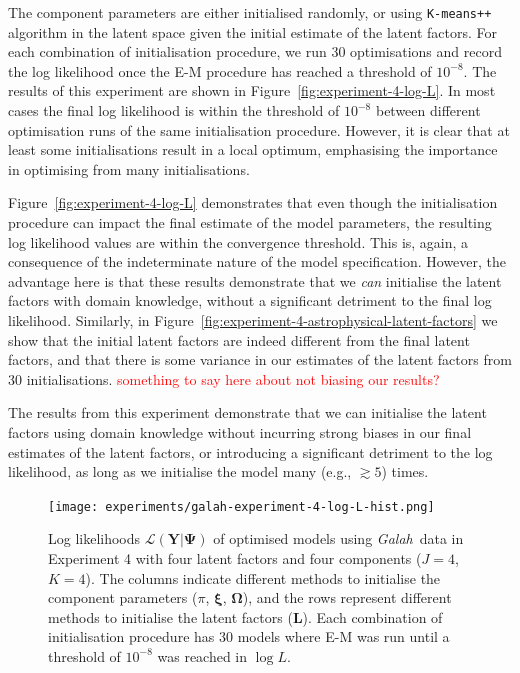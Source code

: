 \documentclass[twocolumn]{aastex61}
\newcommand{\project}[1]{\textsl{#1}}
\newcommand{\Galah}{\project{Galah}}
\newcommand{\todo}[1]{\textcolor{red}{#1}}
\newcommand{\vect}[1]{\boldsymbol{\mathbf{#1}}}
\renewcommand{\vec}[1]{\vect{#1}}
\newcommand{\data}{\textbf{Y}}
\newcommand{\factorloads}{\textbf{L}}
\newcommand{\scoremeans}{\vec\xi}
\newcommand{\scorecovs}{\vec\Omega}
\begin{document}

The component parameters are either initialised randomly, or using \texttt{K-means++} algorithm in
the latent space given the initial estimate of the latent factors. For each combination of 
initialisation procedure, we run 30 optimisations and record the log likelihood once the E-M 
procedure has reached a threshold of $10^{-8}$.
The results of this experiment are shown in Figure~\ref{fig:experiment-4-log-L}.
In most cases the final log likelihood is within the threshold of $10^{-8}$ between
different optimisation runs of the same initialisation procedure. However, it is clear
that at least some initialisations result in a local optimum, emphasising the importance in
optimising from many initialisations. 

Figure~\ref{fig:experiment-4-log-L} demonstrates that even though the initialisation procedure
can impact the final estimate of the model parameters, the resulting log likelihood values
are within the convergence threshold. This is, again, a consequence of the indeterminate
nature of the model specification. However, the advantage here is that these results
demonstrate that we \emph{can} initialise the latent factors with domain knowledge,
without a significant detriment to the final log likelihood. Similarly, in Figure~\ref{fig:experiment-4-astrophysical-latent-factors}
we show that the initial latent factors are indeed different from the final latent factors,
and that there is some variance in our estimates of the latent factors from 30 initialisations.
\todo{something to say here about not biasing our results?}

The results from this experiment demonstrate that we can initialise the latent factors
using domain knowledge without incurring strong biases in our final estimates of the
latent factors, or introducing a significant detriment to the log likelihood, as long
as we initialise the model many (e.g., $\gtrsim 5$) times.

\begin{figure}
	\texttt{[image: experiments/galah-experiment-4-log-L-hist.png]}
	\caption{Log likelihoods $\mathcal{L}\left(\data|\vec\Psi\right)$ of optimised
			 models using \Galah\ data in Experiment 4 with four latent factors
			 and four components ($J = 4$, $K = 4$). The columns indicate different
			 methods to initialise the component parameters ($\pi$, $\scoremeans$,
			 $\scorecovs$), and the rows represent different methods to initialise
			 the latent factors ($\factorloads$). Each combination of initialisation
			 procedure has 30 models where E-M was run until a threshold of $10^{-8}$
			 was reached in $\log{L}$.}
	\label{fig:galah-experiment-4-log-L}
\end{figure}
\end{document}
